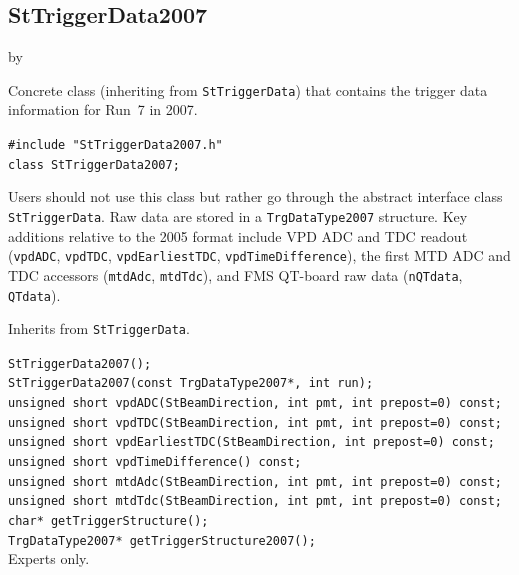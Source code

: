 \documentclass[twoside]{article}
\newcommand{\entrylabel}[1]{\mbox{\textbf{{#1}}}\hfil}%
\newenvironment{entry}
{\begin{list}{}%
    {\renewcommand{\makelabel}{\entrylabel}%
     \setlength{\labelwidth}{90pt}%
     \setlength{\leftmargin}{\labelwidth}
     \advance\leftmargin by \labelsep%
      }%
    }%
  {\end{list}}
\newcommand{\Entrylabel}[1]%
{\raisebox{0pt}[1ex][0pt]{\makebox[\labelwidth][l]%
    {\parbox[t]{\labelwidth}{\hspace{0pt}\textbf{{#1}}}}}}
\newenvironment{Entry}%
{\renewcommand{\entrylabel}{\Entrylabel}\begin{entry}}%
  {\end{entry}}
\begin{document}
\subsection{StTriggerData2007}
\label{sec:StTriggerData2007}
\begin{Entry}
\item[Summary] Concrete class (inheriting from \texttt{StTriggerData}) that
    contains the trigger data information for Run~7 in 2007.
\item[Synopsis]
    \verb+#include "StTriggerData2007.h"+\\
    \verb+class StTriggerData2007;+\\
\item[Description] Users should not use this class but rather go through the
    abstract interface class \texttt{StTriggerData}.  Raw data are stored in a
    \verb+TrgDataType2007+ structure.  Key additions relative to the 2005 format
    include VPD ADC and TDC readout (\verb+vpdADC+, \verb+vpdTDC+,
    \verb+vpdEarliestTDC+, \verb+vpdTimeDifference+), the first MTD ADC and TDC
    accessors (\verb+mtdAdc+, \verb+mtdTdc+), and FMS QT-board raw data
    (\verb+nQTdata+, \verb+QTdata+).
\item[Related Classes] Inherits from \texttt{StTriggerData}.
\item[Public\\ Constructors]
    \verb+StTriggerData2007();+\\
    \verb+StTriggerData2007(const TrgDataType2007*, int run);+\\
    \verb+unsigned short vpdADC(StBeamDirection, int pmt, int prepost=0) const;+\\
    \verb+unsigned short vpdTDC(StBeamDirection, int pmt, int prepost=0) const;+\\
    \verb+unsigned short vpdEarliestTDC(StBeamDirection, int prepost=0) const;+\\
    \verb+unsigned short vpdTimeDifference() const;+\\
    \verb+unsigned short mtdAdc(StBeamDirection, int pmt, int prepost=0) const;+\\
    \verb+unsigned short mtdTdc(StBeamDirection, int pmt, int prepost=0) const;+\\
    \verb+char* getTriggerStructure();+\\
    \verb+TrgDataType2007* getTriggerStructure2007();+\\
    Experts only.
\end{Entry}
\clearpage
\end{document}
